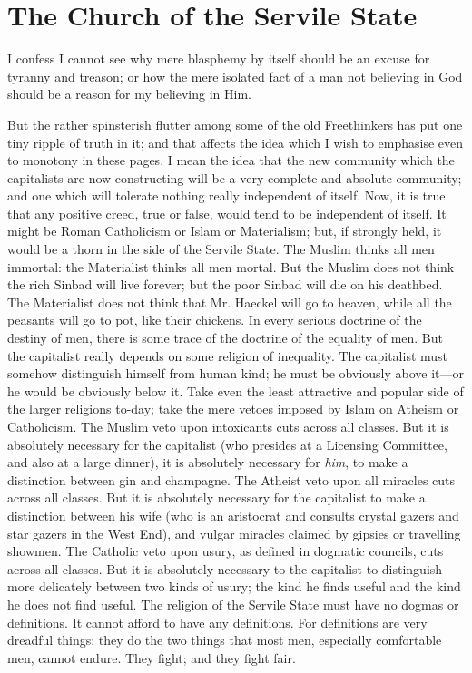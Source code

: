 \documentclass{book}
\begin{document}
\chapter{The Church of the Servile State}
\label{chapter-4}
I confess I cannot see why mere blasphemy by itself should be an excuse for tyranny and treason; or how the mere isolated fact of a man not believing in God should be a reason for my believing in Him.

But the rather spinsterish flutter among some of the old Freethinkers has put one tiny ripple of truth in it; and that affects the idea which I wish to emphasise even to monotony in these pages. I mean the idea that the new community which the capitalists are now constructing will be a very complete and absolute community; and one which will tolerate nothing really independent of itself. Now, it is true that any positive creed, true or false, would tend to be independent of itself. It might be Roman Catholicism or Islam or Materialism; but, if strongly held, it would be a thorn in the side of the Servile State. The Muslim thinks all men immortal: the Materialist thinks all men mortal. But the Muslim does not think the rich Sinbad will live forever; but the poor Sinbad will die on his deathbed. The Materialist does not think that Mr. Haeckel will go to heaven, while all the peasants will go to pot, like their chickens. In every serious doctrine of the destiny of men, there is some trace of the doctrine of the equality of men. But the capitalist really depends on some religion of inequality. The capitalist must somehow distinguish himself from human kind; he must be obviously above it—or he would be obviously below it. Take even the least attractive and popular side of the larger religions to-day; take the mere vetoes imposed by Islam on Atheism or Catholicism. The Muslim veto upon intoxicants cuts across all classes. But it is absolutely necessary for the capitalist (who presides at a Licensing Committee, and also at a large dinner), it is absolutely necessary for \emph{him}, to make a distinction between gin and champagne. The Atheist veto upon all miracles cuts across all classes. But it is absolutely necessary for the capitalist to make a distinction between his wife (who is an aristocrat and consults crystal gazers and star gazers in the West End), and vulgar miracles claimed by gipsies or travelling showmen. The Catholic veto upon usury, as defined in dogmatic councils, cuts across all classes. But it is absolutely necessary to the capitalist to distinguish more delicately between two kinds of usury; the kind he finds useful and the kind he does not find useful. The religion of the Servile State must have no dogmas or definitions. It cannot afford to have any definitions. For definitions are very dreadful things: they do the two things that most men, especially comfortable men, cannot endure. They fight; and they fight fair.
\end{document}
